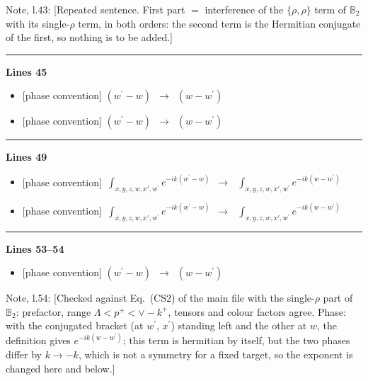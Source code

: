 \documentclass[10pt]{article}
\newenvironment{notebox}{\def\FrameCommand{{\color{notebar}\vrule width 1.5pt}\hspace{6pt}}\MakeFramed{\advance\hsize-\width\FrameRestore}\small}{\endMakeFramed}
\def\mf#1{\mathbb{#1}}
\begin{document}
\begin{notebox}\textsf{\small Note, l.43:} [Repeated sentence. First part $=$ interference of the $\{\rho,\rho\}$ term of $\mf{B}_2$ with its single-$\rho$ term, in both orders: the second term is the Hermitian conjugate of the first, so nothing is to be added.]\end{notebox}
\noindent\rule{\linewidth}{0.3pt}\par\noindent\textbf{Lines 45} \par
\begin{itemize}[leftmargin=2.2em,itemsep=1pt,topsep=2pt]
\item[\textbf{l.45}] \textsf{\small [phase convention]} $\displaystyle (w^{\prime}-w)$\ $\longrightarrow$\ $\displaystyle (w-w^{\prime})$
\item[\textbf{l.45}] \textsf{\small [phase convention]} $\displaystyle (w^{\prime}-w)$\ $\longrightarrow$\ $\displaystyle (w-w^{\prime})$
\end{itemize}
\noindent\rule{\linewidth}{0.3pt}\par\noindent\textbf{Lines 49} \par
\begin{itemize}[leftmargin=2.2em,itemsep=1pt,topsep=2pt]
\item[\textbf{l.49}] \textsf{\small [phase convention]} $\displaystyle \,\int_{x,y,z,w,x',w^{\prime}} e^{-ik(w^{\prime}-w)}$\ $\longrightarrow$\ $\displaystyle \,\int_{x,y,z,w,x',w^{\prime}} e^{-ik(w-w^{\prime})}$
\item[\textbf{l.49}] \textsf{\small [phase convention]} $\displaystyle \,\int_{x,y,z,w,x',w^{\prime}} e^{-ik(w^{\prime}-w)}$\ $\longrightarrow$\ $\displaystyle \,\int_{x,y,z,w,x',w^{\prime}} e^{-ik(w-w^{\prime})}$
\end{itemize}
\noindent\rule{\linewidth}{0.3pt}\par\noindent\textbf{Lines 53--54} \par
\begin{itemize}[leftmargin=2.2em,itemsep=1pt,topsep=2pt]
\item[\textbf{l.53}] \textsf{\small [phase convention]} $\displaystyle (w^{\prime}-w)$\ $\longrightarrow$\ $\displaystyle (w-w^{\prime})$
\end{itemize}
\begin{notebox}\textsf{\small Note, l.54:} [Checked against Eq.~(CS2) of the main file with the single-$\rho$ part of $\mf{B}_{2}$: prefactor, range $\Lambda<p^{+}<\vee-k^{+}$, tensors and colour factors agree. Phase: with the conjugated bracket (at $w^{\prime}$, $x^{\prime}$) standing left and the other at $w$, the definition gives $e^{-ik(w-w^{\prime})}$; this term is hermitian by itself, but the two phases differ by $k\to-k$, which is not a symmetry for a fixed target, so the exponent is changed here and below.]\end{notebox}
\end{document}
